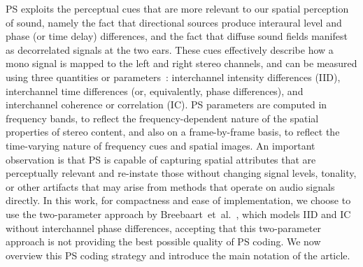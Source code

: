 \documentclass{article}
\newcommand{\joan}[1]{{\color{blue}[JOAN: #1]}}
\newcommand{\joan}[1]{}
\begin{document}
PS exploits the perceptual cues that are more relevant to our spatial perception of sound, namely the fact that directional sources produce interaural level and phase (or time delay) differences, and the fact that diffuse sound fields manifest as decorrelated signals at the two ears. These cues effectively describe how a mono signal is mapped to the left and right stereo channels, and can be measured using three quantities or parameters~\cite{Purnhagen_2004,Breebaart2005}: interchannel intensity differences (IID), interchannel time differences (or, equivalently, phase differences), and interchannel coherence or correlation (IC). %
PS parameters are computed in frequency bands, to reflect the frequency-dependent nature of the spatial properties of stereo content, and also on a frame-by-frame basis, to reflect the time-varying nature of frequency cues and spatial images. 
An important observation is that PS is capable of capturing spatial attributes that are perceptually relevant and re-instate those without changing signal levels, tonality, or other artifacts that may arise from methods that operate on audio signals directly. 
In this work, for compactness and ease of implementation, %
we choose to use the two-parameter approach by Breebaart~et~al.~\cite{Breebaart2005}, which models IID and IC without interchannel phase differences, accepting that this two-parameter approach is not providing the best possible quality of PS coding. We now overview this PS coding strategy and introduce the main notation of the article.
\end{document}
